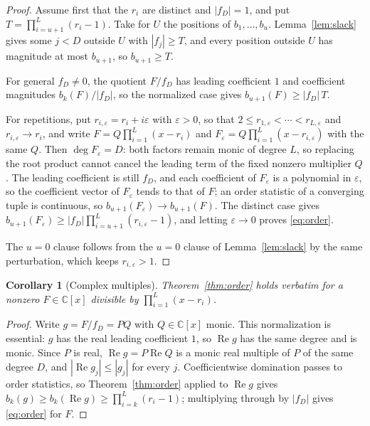 \documentclass[11pt]{article}
\newtheorem{corollary}[theorem]{Corollary}
\begin{document}
\begin{proof}
Assume first that the $r_i$ are distinct and $|f_D|=1$, and put
$T=\prod_{i=u+1}^L(r_i-1)$.  Take for $U$ the positions of $b_1,\ldots,b_u$.
Lemma~\ref{lem:slack} gives some $j<D$ outside $U$ with $|f_j|\ge T$, and
every position outside $U$ has magnitude at most $b_{u+1}$, so
$b_{u+1}\ge T$.

For general $f_D\ne0$, the quotient $F/f_D$ has leading coefficient $1$ and
coefficient magnitudes $b_k(F)/|f_D|$, so the normalized case gives
$b_{u+1}(F)\ge|f_D|\,T$.

For repetitions, put $r_{i,\varepsilon}=r_i+i\varepsilon$ with
$\varepsilon>0$, so that $2\le r_{1,\varepsilon}<\cdots<r_{L,\varepsilon}$ and
$r_{i,\varepsilon}\to r_i$, and write $F=Q\prod_{i=1}^L(x-r_i)$ and
$F_\varepsilon=Q\prod_{i=1}^L(x-r_{i,\varepsilon})$ with the same $Q$.  Then
$\deg F_\varepsilon=D$: both factors remain monic of degree $L$, so replacing
the root product cannot cancel the leading term of the fixed nonzero
multiplier $Q$.  The leading coefficient is still $f_D$, and each
coefficient of $F_\varepsilon$ is a polynomial in $\varepsilon$, so the
coefficient vector of $F_\varepsilon$ tends to that of $F$; an order statistic of a converging tuple is continuous, so
$b_{u+1}(F_\varepsilon)\to b_{u+1}(F)$.  The distinct case gives
$b_{u+1}(F_\varepsilon)\ge|f_D|\prod_{i=u+1}^L(r_{i,\varepsilon}-1)$, and letting
$\varepsilon\to0$ proves \eqref{eq:order}.

The $u=0$ clause follows from the $u=0$ clause of Lemma~\ref{lem:slack} by
the same perturbation, which keeps $r_{i,\varepsilon}>1$.
\end{proof}

\begin{corollary}[Complex multiples]\label{cor:complex}
Theorem~\ref{thm:order} holds verbatim for a nonzero $F\in\mathbb C[x]$
divisible by $\prod_{i=1}^L(x-r_i)$.
\end{corollary}

\begin{proof}
Write $g=F/f_D=PQ$ with $Q\in\mathbb C[x]$ monic.  This normalization is
essential: $g$ has the real leading coefficient $1$, so $\operatorname{Re}g$
has the same degree and is monic.  Since $P$ is real,
$\operatorname{Re}g=P\operatorname{Re}Q$ is a monic real multiple of $P$ of
the same degree $D$, and $|\operatorname{Re}g_j|\le|g_j|$ for every $j$.
Coefficientwise domination passes to order statistics, so
Theorem~\ref{thm:order} applied to $\operatorname{Re}g$ gives
$b_k(g)\ge b_k(\operatorname{Re}g)\ge\prod_{i=k}^L(r_i-1)$; multiplying
through by $|f_D|$ gives \eqref{eq:order} for $F$.
\end{proof}
\end{document}
